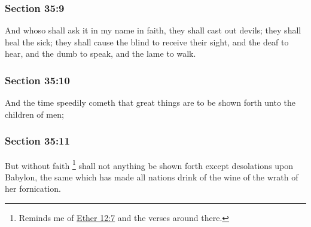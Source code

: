 	\subsubsection{Section 35:9} %
		\label{DC35-9}

		And whoso shall ask it in my name in faith, they shall cast out devils; they shall heal the sick; they shall cause the blind to receive their sight, and the deaf to hear, and the dumb to speak, and the lame to walk.


	\subsubsection{Section 35:10} %
		\label{DC35-10}

		And the time speedily cometh that great things are to be shown forth unto the children of men;


	\subsubsection{Section 35:11} %
		\label{DC35-11}

		But without faith%
			\footnote{%
				Reminds me of \hyperref[ETHER-12-7]{Ether 12:7} and the verses around there.
				} 
		shall not anything be shown forth except desolations upon Babylon, the same which has made all nations drink of the wine of the wrath of her fornication.

